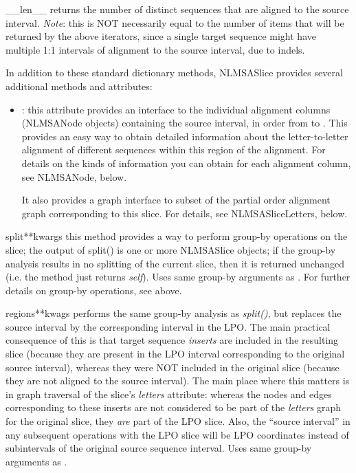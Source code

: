 \documentclass{howto}
\begin{document}
\begin{funcdesc}{__len__}{}
  returns the number of distinct sequences that
  are aligned to the source interval.  {\em Note}: this is NOT necessarily 
  equal to the number of items that will be returned by the above iterators,
  since a single target sequence might have multiple 1:1 intervals of
  alignment to the source interval, due to indels.
\end{funcdesc}



In addition to these standard dictionary methods, NLMSASlice provides
several additional methods and attributes:


\begin{itemize}
\item
{}: this attribute provides an interface to 
the individual alignment columns (NLMSANode objects) containing the
source interval, in order from  to .  This provides
an easy way to obtain detailed information about the letter-to-letter
alignment of different sequences within this region of the alignment.
For details on the kinds of information you can obtain for each
alignment column, see NLMSANode, below.

It also provides a graph interface to subset of the partial order alignment 
graph corresponding to this slice.  For details, see NLMSASliceLetters, below.
\end{itemize}

\begin{funcdesc}{split}{**kwargs}
  this method provides a way to perform group-by operations on the slice;
  the output of split() is one or more NLMSASlice objects; if the
  group-by analysis results in no splitting of the current slice, then
  it is returned unchanged (i.e. the method just returns {\em self}).
  Uses same group-by arguments as .
  For further details on group-by operations, see  above.
\end{funcdesc}

\begin{funcdesc}{regions}{**kwags}
  performs the same group-by analysis as {\em split()}, but replaces
  the source interval by the corresponding interval in the LPO.  The main
  practical consequence of this is that target sequence {\em inserts}
  are included in the resulting slice (because they are present in the LPO
  interval corresponding to the original source interval), whereas they
  were NOT included in the original slice (because they are not aligned
  to the source interval).  The main place where this matters is in graph
  traversal of the slice's {\em letters} attribute: whereas the nodes
  and edges corresponding to these inserts are not considered to be part
  of the {\em letters} graph for the original slice, they {\em are} part of the
  LPO slice.  Also, the ``source interval'' in any subsequent operations
  with the LPO slice will be LPO coordinates instead of subintervals of the
  original source sequence interval.
  Uses same group-by arguments as .
\end{funcdesc}
\end{document}
